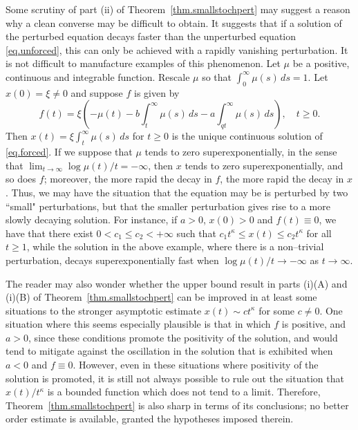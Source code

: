 \documentclass[a4paper,10pt,reqno]{amsart}
\numberwithin{equation}{section}
\theoremstyle{definition}
\theoremstyle{remark}
\DeclareMathOperator{\1}{\mathbbm 1}
\begin{document}
Some scrutiny of part (ii) of  Theorem~\ref{thm.smallstochpert} may suggest a reason why a clean converse may be difficult to obtain. It suggests that if a solution of the perturbed equation decays faster than the unperturbed equation \eqref{eq.unforced}, this can only be achieved with a rapidly vanishing perturbation. It is not difficult to manufacture examples of this phenomenon. Let $\mu$ be a positive, continuous and integrable function.
Rescale $\mu$ so that $\int_0^\infty \mu(s)\,ds=1$. Let $x(0)=\xi\neq 0$ and suppose $f$ is given by 
\[
f(t)=\xi\left(-\mu(t)-b\int_t^\infty \mu(s)\,ds -a\int_{qt}^\infty \mu(s)\,ds\right), \quad  t\geq 0.
\] 
Then $x(t)=\xi \int_t^\infty \mu(s)\,ds$  for $t\geq 0$ is the unique continuous solution of \eqref{eq.forced}. If we suppose that $\mu$ tends to zero superexponentially, in the sense that $\lim_{t\to\infty} \log \mu(t)/t=-\infty$, then $x$ tends to zero superexponentially, and so does $f$; moreover, the more rapid the decay in $f$, the more rapid the decay in $x$. Thus, we may have the situation that the equation may be is perturbed by two ``small" perturbations, but that the smaller perturbation gives rise to a more slowly decaying solution. For instance, if $a>0$, $x(0)>0$ and $f(t)\equiv 0$, we have that there exist $0<c_1\leq c_2<+\infty$ such that $c_1t^\kappa \leq x(t)\leq c_2t^\kappa$ for all $t\geq 1$, while the solution in the above example, where there is a non--trivial perturbation, decays superexponentially fast when 
$\log \mu(t)/t\to-\infty$ as $t\to\infty$. 

The reader may also wonder whether the upper bound result in parts (i)(A) and (i)(B) of Theorem~\ref{thm.smallstochpert} can be improved in at least some situations to the stronger asymptotic estimate $x(t)\sim ct^\kappa$ for some $c\neq 0$. One situation where this seems especially plausible is that in which $f$ is positive, and $a>0$, since these conditions promote the positivity of the solution, and would tend to mitigate against the oscillation in the solution that is exhibited when $a<0$ and $f\equiv 0$. However, even in these situations where positivity of the solution is promoted, it is still not always possible to rule out the situation that $x(t)/t^\kappa$ is a bounded function which does not tend to a limit. Therefore, Theorem~\ref{thm.smallstochpert} is also sharp in terms of its conclusions; no better order estimate is available, granted the hypotheses imposed therein.   
\end{document}
